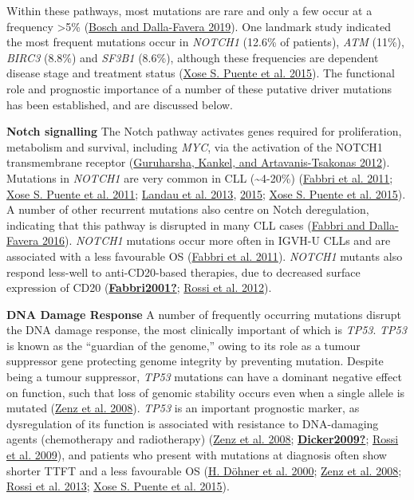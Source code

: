 \documentclass[11pt, a4paper, twosided]{book}
\begin{document}
Within these pathways, most mutations are rare and only a few occur at a frequency \textgreater5\% (\protect\hyperlink{ref-Bosch2019}{Bosch and Dalla-Favera 2019}). One landmark study indicated the most frequent mutations occur in \emph{NOTCH1} (12.6\% of patients), \emph{ATM} (11\%), \emph{BIRC3} (8.8\%) and \emph{SF3B1} (8.6\%), although these frequencies are dependent disease stage and treatment status (\protect\hyperlink{ref-Puente2015}{Xose S. Puente et al. 2015}). The functional role and prognostic importance of a number of these putative driver mutations has been established, and are discussed below.

\textbf{Notch signalling}
The Notch pathway activates genes required for proliferation, metabolism and survival, including \emph{MYC}, via the activation of the NOTCH1 transmembrane receptor (\protect\hyperlink{ref-Guruharsha2012}{Guruharsha, Kankel, and Artavanis-Tsakonas 2012}). Mutations in \emph{NOTCH1} are very common in CLL (\textasciitilde4-20\%) (\protect\hyperlink{ref-Fabbri2011}{Fabbri et al. 2011}; \protect\hyperlink{ref-Puente2011}{Xose S. Puente et al. 2011}; \protect\hyperlink{ref-Landau2013}{Landau et al. 2013}, \protect\hyperlink{ref-Landau2015}{2015}; \protect\hyperlink{ref-Puente2015}{Xose S. Puente et al. 2015}). A number of other recurrent mutations also centre on Notch deregulation, indicating that this pathway is disrupted in many CLL cases (\protect\hyperlink{ref-Fabbri2016}{Fabbri and Dalla-Favera 2016}). \emph{NOTCH1} mutations occur more often in IGVH-U CLLs and are associated with a less favourable OS (\protect\hyperlink{ref-Fabbri2011}{Fabbri et al. 2011}). \emph{NOTCH1} mutants also respond less-well to anti-CD20-based therapies, due to decreased surface expression of CD20 (\protect\hyperlink{ref-Fabbri2001}{\textbf{Fabbri2001?}}; \protect\hyperlink{ref-Rossi2012}{Rossi et al. 2012}).

\textbf{DNA Damage Response}
A number of frequently occurring mutations disrupt the DNA damage response, the most clinically important of which is \emph{TP53}. \emph{TP53} is known as the ``guardian of the genome,'' owing to its role as a tumour suppressor gene protecting genome integrity by preventing mutation. Despite being a tumour suppressor, \emph{TP53} mutations can have a dominant negative effect on function, such that loss of genomic stability occurs even when a single allele is mutated (\protect\hyperlink{ref-Zenz2008}{Zenz et al. 2008}). \emph{TP53} is an important prognostic marker, as dysregulation of its function is associated with resistance to DNA-damaging agents (chemotherapy and radiotherapy) (\protect\hyperlink{ref-Zenz2008}{Zenz et al. 2008}; \protect\hyperlink{ref-Dicker2009}{\textbf{Dicker2009?}}; \protect\hyperlink{ref-Rossi2009}{Rossi et al. 2009}), and patients who present with mutations at diagnosis often show shorter TTFT and a less favourable OS (\protect\hyperlink{ref-Dohner2000}{H. Döhner et al. 2000}; \protect\hyperlink{ref-Zenz2008}{Zenz et al. 2008}; \protect\hyperlink{ref-Rossi2013}{Rossi et al. 2013}; \protect\hyperlink{ref-Puente2015}{Xose S. Puente et al. 2015}).
\end{document}
